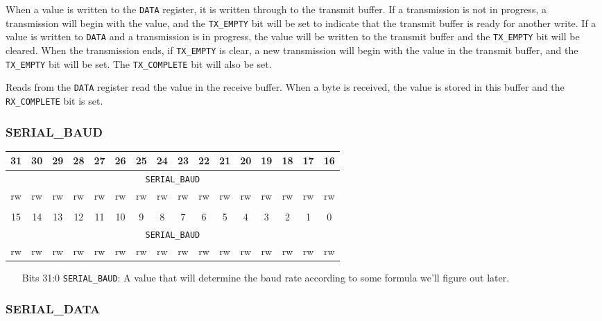 \documentclass[11pt,openany]{report}
\begin{document}
When a value is written to the \verb|DATA| register, it is written
through to the transmit buffer. If a transmission is not in progress,
a transmission will begin with the value, and the \verb|TX_EMPTY|
bit will be set to indicate that the transmit buffer is ready for
another write. If a value is written to \verb|DATA| and a transmission
is in progress, the value will be written to the transmit buffer and
the \verb|TX_EMPTY| bit will be cleared. When the transmission
ends, if \verb|TX_EMPTY| is clear, a new transmission will begin
with the value in the transmit buffer, and the \verb|TX_EMPTY|
bit will be set. The \verb|TX_COMPLETE| bit will also be set.

Reads from the \verb|DATA| register read the value in the receive buffer.
When a byte is received, the value is stored in this buffer and the
\verb|RX_COMPLETE| bit is set.

\subsubsection{SERIAL\_BAUD}

\centering
\begin{tabular}{|c|c|c|c|c|c|c|c|c|c|c|c|c|c|c|c|}
  \hline
  31 & 30 & 29 & 28 & 27 & 26 & 25 & 24 & 23 & 22 & 21 & 20 & 19 & 18 & 17 & 16 \\
  \hline
  \multicolumn{16}{|c|}{\texttt{SERIAL\_BAUD}}\\
  \hline
  rw & rw & rw & rw & rw & rw & rw & rw & rw & rw & rw & rw & rw & rw & rw & rw\\
  \hline
  \multicolumn{16}{c}{}\\
  \hline
  15 & 14 & 13 & 12 & 11 & 10 & 9 & 8 & 7 & 6 & 5 & 4 & 3 & 2 & 1 & 0 \\
  \hline
  \multicolumn{16}{|c|}{\texttt{SERIAL\_BAUD}}\\
  \hline
  rw & rw & rw & rw & rw & rw & rw & rw & rw & rw & rw & rw & rw & rw & rw & rw\\
  \hline
\end{tabular}

\begin{enumerate}
\item[Bits 31:0] \verb|SERIAL_BAUD|: A value that will determine the baud
rate according to some formula we'll figure out later.
\end{enumerate}

\subsubsection{SERIAL\_DATA}
\end{document}

